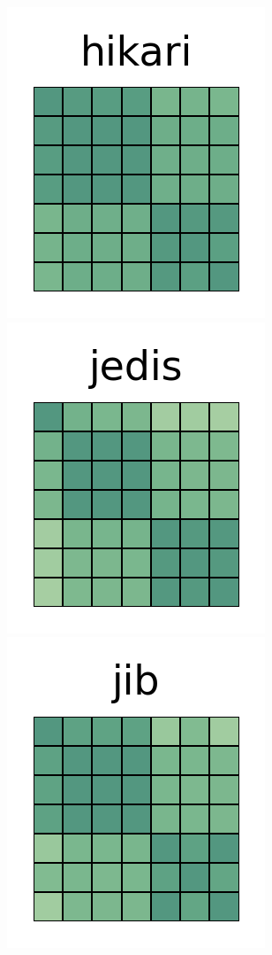 \documentclass[10pt,conference]{IEEEtran}
\begin{document}
\begin{figure}[htb!]
 \includegraphics[width=\heatmapWidth, keepaspectratio]{correlations-classic/hikaricp-grids.png} \\
 \includegraphics[width=\heatmapWidth, keepaspectratio]{correlations-classic/jedis-grids.png}
 \includegraphics[width=\heatmapWidth, keepaspectratio]{correlations-classic/jib-grids.png}

\end{figure}
\end{document}
